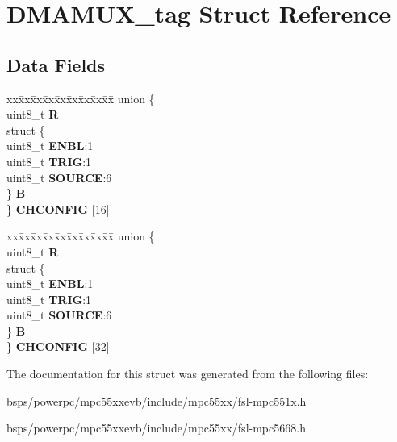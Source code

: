 \hypertarget{structDMAMUX__tag}{}\section{D\+M\+A\+M\+U\+X\+\_\+tag Struct Reference}
\label{structDMAMUX__tag}
\subsection*{Data Fields}
\begin{DoxyCompactItemize}
\item 
\mbox{\label{structDMAMUX__tag_ad0d0e18045d73fa532b0d27f41190b80}} 
\begin{tabbing}
xx\=xx\=xx\=xx\=xx\=xx\=xx\=xx\=xx\=\kill
union \{\\
\>uint8\_t {\bfseries R}\\
\>struct \{\\
\>\>uint8\_t {\bfseries ENBL}:1\\
\>\>uint8\_t {\bfseries TRIG}:1\\
\>\>uint8\_t {\bfseries SOURCE}:6\\
\>\} {\bfseries B}\\
\} {\bfseries CHCONFIG} \mbox{[}16\mbox{]}\\

\end{tabbing}\item 
\mbox{\label{structDMAMUX__tag_a22aa9e43d859d32b05556269bc62db30}} 
\begin{tabbing}
xx\=xx\=xx\=xx\=xx\=xx\=xx\=xx\=xx\=\kill
union \{\\
\>uint8\_t {\bfseries R}\\
\>struct \{\\
\>\>uint8\_t {\bfseries ENBL}:1\\
\>\>uint8\_t {\bfseries TRIG}:1\\
\>\>uint8\_t {\bfseries SOURCE}:6\\
\>\} {\bfseries B}\\
\} {\bfseries CHCONFIG} \mbox{[}32\mbox{]}\\

\end{tabbing}\end{DoxyCompactItemize}


The documentation for this struct was generated from the following files\+:\begin{DoxyCompactItemize}
\item 
bsps/powerpc/mpc55xxevb/include/mpc55xx/fsl-\/mpc551x.\+h\item 
bsps/powerpc/mpc55xxevb/include/mpc55xx/fsl-\/mpc5668.\+h\end{DoxyCompactItemize}
